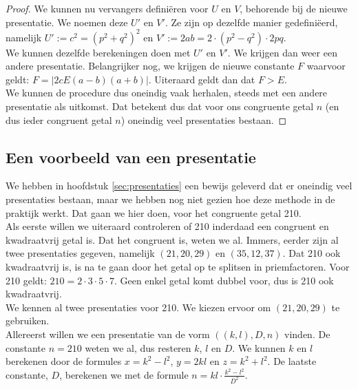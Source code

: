 \documentclass[12pt,reqno]{article}
\theoremstyle{theorem}
\theoremstyle{definition}
\begin{document}
\begin{proof}
		We kunnen nu vervangers definiëren voor $U$ en $V$, behorende bij de nieuwe presentatie. We noemen deze $U'$ en $V'$. Ze zijn op dezelfde manier gedefini\"eerd, namelijk $U':=c^2=(p^2+q^2)^2$ en $V':=2ab=2\cdot(p^2-q^2)\cdot2pq$.\\
		
		We kunnen dezelfde berekeningen doen met $U'$ en $V'$. We krijgen dan weer een andere presentatie. Belangrijker nog, we krijgen de nieuwe constante $F$ waarvoor geldt: $F=|2 c E (a-b) (a+b)|.$ Uiteraard geldt dan dat $F > E$.\\
		
		We kunnen de procedure dus oneindig vaak herhalen, steeds met een andere presentatie als uitkomst. Dat betekent dus dat voor ons congruente getal $n$ (en dus ieder congruent getal $n$) oneindig veel presentaties bestaan.
	\end{proof}
	
	\subsection{Een voorbeeld van een presentatie}
	We hebben in hoofdstuk \ref{sec:presentaties} een bewijs geleverd dat er oneindig veel presentaties bestaan, maar we hebben nog niet gezien hoe deze methode in de praktijk werkt. Dat gaan we hier doen, voor het congruente getal 210.\\
	
	Als eerste willen we uiteraard controleren of 210 inderdaad een congruent en kwadraatvrij getal is. Dat het congruent is, weten we al. Immers, eerder zijn al twee presentaties gegeven, namelijk $(21,20,29)$ en $(35,12,37)$. Dat 210 ook kwadraatvrij is, is na te gaan door het getal op te splitsen in priemfactoren. Voor 210 geldt: $210 = 2 \cdot 3 \cdot 5 \cdot 7$. Geen enkel getal komt dubbel voor, dus is 210 ook kwadraatvrij.\\
	
	We kennen al twee presentaties voor 210. We kiezen ervoor om $(21,20,29)$ te gebruiken.\\
	
	Allereerst willen we een presentatie van de vorm $((k,l),D,n)$ vinden. De constante $n=210$ weten we al, dus resteren $k$, $l$ en $D$. We kunnen $k$ en $l$ berekenen door de formules $x = k^2 - l^2$, $y = 2kl$ en $z = k^2 + l^2$. De laatste constante, $D$, berekenen we met de formule $n = kl \cdot \frac{k^2-l^2}{D^2}$.\\
	
\end{document}
